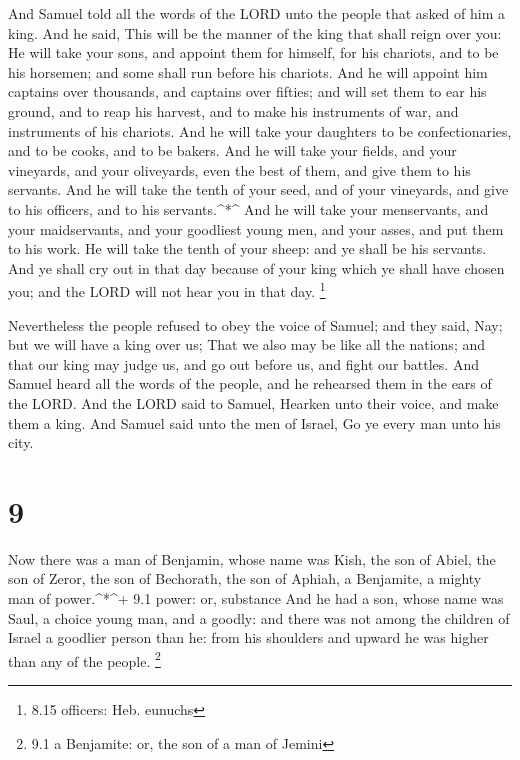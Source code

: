  And Samuel told all the words of the LORD unto the people
that asked of him a king.  And he said, This will be the
manner of the king that shall reign over you: He will take your sons,
and appoint them for himself, for his chariots, and to be his horsemen;
and some shall run before his chariots.  And he will
appoint him captains over thousands, and captains over fifties; and will
set them to ear his ground, and to reap his harvest, and to make his
instruments of war, and instruments of his chariots.  And
he will take your daughters to be confectionaries, and to be cooks, and
to be bakers.  And he will take your fields, and your
vineyards, and your oliveyards, even the best of them, and give them to
his servants.  And he will take the tenth of your seed, and
of your vineyards, and give to his officers, and to his
servants.\^{}*\^{}  And he will take your menservants, and
your maidservants, and your goodliest young men, and your asses, and put
them to his work.  He will take the tenth of your sheep:
and ye shall be his servants.  And ye shall cry out in that
day because of your king which ye shall have chosen you; and the LORD
will not hear you in that day. \footnote{8.15 officers: Heb. eunuchs}

 Nevertheless the people refused to obey the voice of
Samuel; and they said, Nay; but we will have a king over us;
 That we also may be like all the nations; and that our
king may judge us, and go out before us, and fight our battles.
 And Samuel heard all the words of the people, and he
rehearsed them in the ears of the LORD.  And the LORD said
to Samuel, Hearken unto their voice, and make them a king. And Samuel
said unto the men of Israel, Go ye every man unto his city.

\hypertarget{section-8}{%
\section{9}\label{section-8}}

 Now there was a man of Benjamin, whose name was Kish, the
son of Abiel, the son of Zeror, the son of Bechorath, the son of Aphiah,
a Benjamite, a mighty man of power.\^{}*\^{}+ 9.1 power: or, substance
 And he had a son, whose name was Saul, a choice young man,
and a goodly: and there was not among the children of Israel a goodlier
person than he: from his shoulders and upward he was higher than any of
the people. \footnote{9.1 a Benjamite: or, the son of a man of Jemini}

